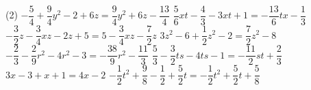 \documentclass[a4paper,12pt]{report}
\begin{document}
\begin{core}\phantom{ }

\begin{tasks}(2)
\task $-\dfrac{5}{4}  + \dfrac{9}{4} y^2-2  + 6 z=\dfrac{9}{4} y^2  + 6 z -\dfrac{13}{4}$
\task $\dfrac{5}{6} x t-\dfrac{4}{3} -3 x t + 1= -\dfrac{13}{6} tx-\dfrac{1}{3}$
\task $-\dfrac{3}{2} z-\dfrac{3}{4} x z-2 z + 5 =5 -\dfrac{3}{4} x z-\dfrac{7}{2} z$
\task $3 z^2-6  + \dfrac{1}{2} z^2-2 = \dfrac{7}{2} z^2-8$
\task $-\dfrac{2}{3} -\dfrac{2}{9} r^2-4 r^2-3 = -\dfrac{38}{9} r^2-\dfrac{11}{3}$
	\task $\dfrac{5}{3} -\dfrac{3}{2} t s-4 t s-1= -\dfrac{11}{2} st+\dfrac{2}{3}$
\task $3 x-3  + x + 1=4x-2 $
\task $-\dfrac{1}{2} t^2 + \dfrac{9}{8} -\dfrac{1}{2}  + \dfrac{5}{2} t=-\dfrac{1}{2} t^2+ \dfrac{5}{2} t+\dfrac{5}{8}$
\end{tasks}

\end{core}
\end{document}
